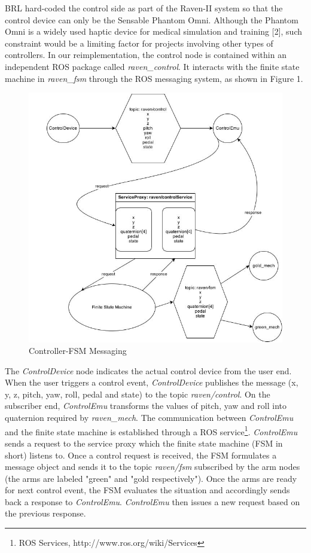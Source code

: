 \documentclass[letterpaper,twocolumn,10pt]{article}
\begin{document}
BRL hard-coded the control side as part of the Raven-II system so that
the control device can only be the Sensable Phantom Omni. Although the
Phantom Omni is a widely used haptic device for medical simulation and
training [2], such constraint would be a limiting factor for projects
involving other types of controllers. In our reimplementation, the
control node is contained within an independent ROS package called
{\it raven\_control}. It interacts with the finite state machine in
{\it raven\_fsm} through the ROS messaging system, as shown in Figure
1.

\begin{figure}[h]
\includegraphics[scale=0.33]{ControlDiagram.jpg}
\caption{Controller-FSM Messaging}
\end{figure}

The {\it ControlDevice} node indicates the actual control device from
the user end. When the user triggers a control event, {\it
  ControlDevice} publishes the message (x, y, z, pitch, yaw, roll,
pedal and state) to the topic {\it raven/control}. On the subscriber
end, {\it ControlEmu} transforms the values of pitch, yaw and roll
into quaternion required by {\it raven\_mech}. The communication
between {\it ControlEmu} and the finite state machine is established
through a ROS service\footnote{ROS Services,
  http://www.ros.org/wiki/Services}. {\it ControlEmu} sends a request
to the service proxy which the finite state machine (FSM in short)
listens to. Once a control request is received, the FSM formulates a
message object and sends it to the topic {\it raven/fsm} subscribed by
the arm nodes (the arms are labeled "green" and "gold
respectively"). Once the arms are ready for next control event, the
FSM evaluates the situation and accordingly sends back a response to
{\it ControlEmu}. {\it ControlEmu} then issues a new request based on
the previous response.
\end{document}
